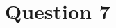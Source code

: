 \documentclass[a4paper]{article}
\begin{document}
\section*{Question 7}
\begin{stlog}\end{stlog}
\end{document}
